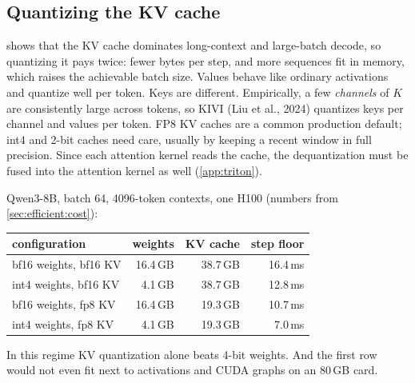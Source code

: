 \subsection{Quantizing the KV cache}
 shows that the KV cache dominates long-context and
large-batch decode, so quantizing it pays twice: fewer bytes per step, and more
sequences fit in memory, which raises the achievable batch size. Values behave like
ordinary activations and quantize well per token. Keys are different. Empirically, a few \emph{channels} of $K$ are consistently large
across tokens, so KIVI (Liu et
al., 2024) quantizes keys per channel and values per token. FP8 KV caches are a common
production default; int4 and 2-bit caches need care, usually by keeping a recent window
in full precision. Since each attention kernel reads the cache, the dequantization must
be fused into the attention kernel as well (\cref{app:triton}).

\begin{napkinmath}
Qwen3-8B, batch 64, 4096-token contexts, one H100 (numbers from
\cref{sec:efficient:cost}):
\begin{center}\small
\begin{tabular}{lrrr}
\toprule
configuration & weights & KV cache & step floor \\
\midrule
bf16 weights, bf16 KV & 16.4\,GB & 38.7\,GB & 16.4\,ms \\
int4 weights, bf16 KV & 4.1\,GB  & 38.7\,GB & 12.8\,ms \\
bf16 weights, fp8 KV  & 16.4\,GB & 19.3\,GB & 10.7\,ms \\
int4 weights, fp8 KV  & 4.1\,GB  & 19.3\,GB & 7.0\,ms \\
\bottomrule
\end{tabular}
\end{center}
In this regime KV quantization alone beats 4-bit weights. And the first row would not
even fit next to activations and CUDA graphs on an 80\,GB card.
\end{napkinmath}

